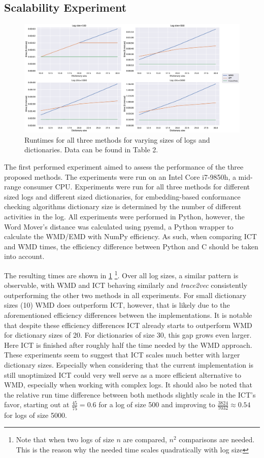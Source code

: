 \documentclass[runningheads]{template/llncs}
\begin{document}
\subsection{Scalability Experiment}
\begin{figure}
	\includegraphics[width=1\textwidth]{figures/scaling}
	\caption{Runtimes for all three methods for varying sizes of logs and dictionaries. Data can be found in \cite{PBWe20} Table 2.}
	\label{fig:scalability}
\end{figure}
The first performed experiment aimed to assess the performance  of the three proposed methods.
The experiments were run on an Intel Core i7-9850h, a mid-range consumer CPU.
Experiments were run for all three methods for different sized logs and different sized dictionaries, for embedding-based conformance checking algorithms dictionary size is determined by the number of different activities in the log.
All experiments were performed in Python, however, the Word Mover's distance was calculated using pyemd, a Python wrapper to calculate the WMD/EMD with NumPy efficiency.
As such, when comparing ICT and WMD times, the efficiency difference between Python and C should be taken into account.

The resulting times are shown in \cref{fig:scalability}
\footnote{Note that when two logs of size $n$ are compared, $n^2$ comparisons are needed. This is the reason why the needed time scales quadratically with log size}.
Over all log sizes, a similar pattern is observable, with WMD and ICT behaving similarly and \emph{trace2vec} consistently outperforming the other two methods in all experiments.
For small dictionary sizes  (10) WMD does outperform ICT, however, that is likely due to the aforementioned efficiency differences between the implementations.
It is notable that despite these efficiency differences ICT already starts to outperform WMD for dictionary sizes of 20.
For dictionaries of size 30, this gap grows even larger.
Here ICT is finished after roughly half the time needed by the WMD approach.
These experiments seem to suggest that ICT scales much better with larger dictionary sizes.
Especially when considering that the current implementation is still unoptimized ICT could very well serve as a more efficient alternative to WMD, especially when working with complex logs.
It should also be noted that the relative run time difference between both methods slightly scale in the ICT's favor, starting out at $\frac{45}{75}=0.6$ for a log of size 500 and improving to $\frac{3824}{7032}\approx 0.54$ for logs of size 5000.
\end{document}
